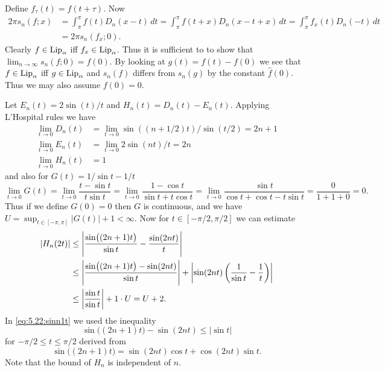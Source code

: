\begin{enumerate}
Define \(f_\tau(t) = f(t + \tau)\).
Now 
\begin{align*}
2\pi s_n(f;x)
&= \int_{\pi}^\pi f(t)D_n(x - t)\,dt
 = \int_{\pi}^\pi f(t+x)D_n(x - t + x)\,dt
 = \int_{\pi}^\pi f_x(t)D_n(-t)\,dt \\
& = 2\pi s_n(f_x;0).
\end{align*}
Clearly \(f\in\mathop{\rm Lip}\nolimits_\alpha\) iff  \(f_x\in\mathop{\rm Lip}\nolimits_\alpha\).
Thus it is sufficient to to show that \(\lim_{n\to\infty} s_n(f;0) = f(0)\).
By looking at \(g(t) = f(t) - f(0)\) we see that 
\(f\in\mathop{\rm Lip}\nolimits_\alpha\) iff  \(g\in\mathop{\rm Lip}\nolimits_\alpha\)
and \(s_n(f)\) differs from \(s_n(g)\) by the constant \(\hat{f}(0)\).
Thus we may also assume \(f(0)=0\).

Let \(E_n(t) = 2\sin(t)/t\)
and \(H_n(t) = D_n(t) - E_n(t)\).
Applying L'Hospital rules we have
\begin{align*}
\lim_{t\to 0} D_n(t) &= \lim_{t\to 0} \sin((n+1/2)t)/\sin(t/2) = 2n+1\\
\lim_{t\to 0} E_n(t) &= \lim_{t\to 0} 2\sin(nt)/t = 2n\\
\lim_{t\to 0} H_n(t) &= 1
\end{align*}
and also for \(G(t) = 1/\sin t - 1/t\)
\begin{equation*}
\lim_{t\to 0} G(t) %
= \lim_{t\to 0} \frac{t - \sin t}{t\sin t}
= \lim_{t\to 0} \frac{1 - \cos t}{\sin t + t\cos t} 
= \lim_{t\to 0} \frac{\sin t}{\cos t + \cos t - t\sin t} 
= \frac{0}{1+1+0} = 0.
\end{equation*}
Thus if we define \(G(0)=0\) then $G$ is continuous,
and we have \(U = \sup_{t\in[-\pi,\pi]} |G(t)|+1 < \infty\).
Now  for \(t\in [-\pi/2,\pi/2]\) we can estimate 
\begin{align}
|H_n(2t)|
&\leq \left|\frac{\sin\bigl((2n+1)t\bigr)}{\sin t} 
      - \frac{\sin(2nt)}{t}\right| \notag \\
&\leq \left|\frac{\sin\bigl((2n+1)t\bigr) - \sin(2nt)}{\sin t}\right|
      + \left| \sin(2nt) \left( \frac{1}{\sin t} - \frac{1}{t}\right) \right|
     \notag \\
&\leq \left| \frac{\sin t}{\sin t}\right| 
     + 1\cdot U = U + 2. \label{eq:5.22:sinn1t}
\end{align}
In \eqref{eq:5.22:sinn1t} we used the inequality
\begin{equation*}
\sin\bigl((2n+1)t\bigr) - \sin(2nt) \leq |\sin t|
\end{equation*}
for \(-\pi/2\leq t \leq \pi/2\) derived from
\begin{equation*}
\sin\bigl((2n+1)t\bigr) = \sin(2nt)\cos t + \cos(2nt)\sin t.
\end{equation*}
Note that the bound of \(H_n\) is independent of $n$.


\end{enumerate}
